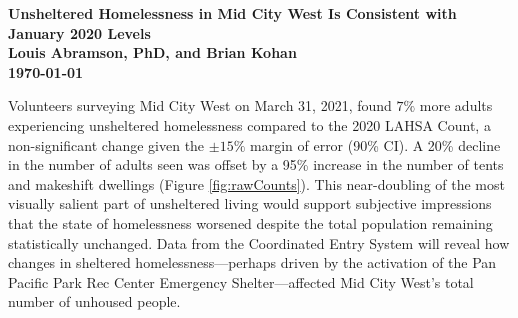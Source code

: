 \documentclass[11pt]{article}
\def\bfr{\bf\color{red}}
\begin{document}

\begin{center}
	\Large\bf Unsheltered Homelessness in Mid City West Is Consistent with January 2020 Levels\\
	\vspace{1ex}
	{\normalsize\rm Louis Abramson, PhD, and Brian Kohan\\ \today 
	}%
\end{center}

 Volunteers surveying Mid City West on March 31, 
2021, found $7\%$ more adults experiencing unsheltered homelessness compared to the 2020 
LAHSA Count, a non-significant change given the $\pm15\%$ margin of error (90\% CI). A 20\%
decline in the number of adults seen was offset by a 95\% increase in the number of tents and 
makeshift dwellings (Figure \ref{fig:rawCounts}). This near-doubling of the most visually salient 
part of unsheltered living would support subjective impressions that the state of homelessness 
worsened despite the total population remaining statistically unchanged. Data from the Coordinated 
Entry System will reveal how changes in sheltered homelessness---perhaps driven by the activation 
of the Pan Pacific Park Rec Center Emergency Shelter---affected Mid City West's total number of 
unhoused people.

\begin{table}[h]
\caption{Mid City West 2021 Unsheltered Counts and Population Estimates}
\caption*{*Neither the change in raw counts or inferred population is statistically significant (parentheses 
denote 90\% uncertainties). No transition age youth, minors, or families were sighted.}
\label{tbl:summary}
\end{table}
\end{document}
